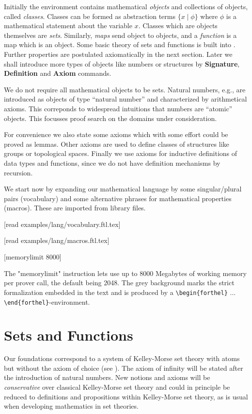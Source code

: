 \documentclass[11pt]{article}
\begin{document}
Initially the environment contains 
mathematical \textit{objects} and collections of objects, called \textit{classes}. Classes can
be formed as abstraction terms $\{x\mid\phi\}$ where $\phi$ is a mathematical
statement about the variable $x$. Classes which are objects themselves are 
\textit{sets}. Similarly, \textit{maps} send object to objects, and a \textit{function}
is a map which is an object.
Some basic theory of sets and functions is built into \Naproche{}. Further properties
are postulated axiomatically in the next section. Later we shall introduce more types 
of objects like numbers or structures 
by \textbf{Signature}, \textbf{Definition} and \textbf{Axiom} commands.

We do not require all mathematical objects to be sets. Natural numbers, e.g., are introduced as objects
of type ``natural number'' and characterized by arithmetical axioms. This correponds to
widespread intuitions that numbers are ``atomic'' objects.
This focusses proof search on the domains under
consideration.

For convenience we also state some axioms which with some effort could be proved as lemmas. 
Other axioms are used to define classes of structures like groups or 
topological spaces. Finally we use axioms for inductive definitions
of data types and functions, since we do not have
definition mechanisms by recursion.

We start now by expanding our mathematical language by some
singular/plural pairs (vocabulary) and some alternative phrases 
for mathematical properties (macros). These are imported from
library files.


\begin{forthel}

[read examples/lang/vocabulary.ftl.tex]

[read examples/lang/macros.ftl.tex]

[memorylimit 8000]

\end{forthel}
%
The "memorylimit" instruction lets \Naproche{} use up to 8000 Megabytes of working memory per prover
call, the default being 2048.
The grey background marks the strict formalization
embedded in the text and is produced by
a
\verb+\+\verb+begin{forthel}+ ...
\verb+\+\verb+end{forthel}+-environment.


\section{Sets and Functions}
Our foundations correspond to a system of Kelley-Morse set theory with atoms 
but without the axiom of choice 
(see \cite{Kelley1975}). The axiom of infinity will be stated after
the introduction of natural numbers.
New notions and axioms will be \textit{conservative} over classical Kelley-Morse set theory and 
could in principle be reduced to definitions and propositions within
Kelley-Morse set theory, as is usual when developing mathematics in set theories.
\end{document}

